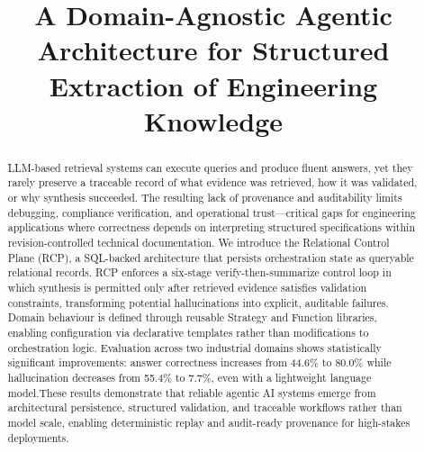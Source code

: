 \documentclass[largeformat]{interact}
\begin{document}
\title{A Domain-Agnostic Agentic Architecture for Structured Extraction of Engineering Knowledge}
\author{
}

\maketitle

\begin{abstract}
LLM-based retrieval systems can execute queries and produce fluent answers, yet they rarely preserve a traceable record of what evidence was retrieved, how it was validated, or why synthesis succeeded.
The resulting lack of provenance and auditability limits debugging, compliance verification, and operational trust—critical gaps for engineering applications where correctness depends on interpreting structured specifications within revision-controlled technical documentation. 
We introduce the Relational Control Plane (RCP), a SQL-backed architecture that persists orchestration state as queryable relational records. RCP enforces a six-stage verify-then-summarize control loop in which synthesis is permitted only after retrieved evidence satisfies validation constraints, transforming potential hallucinations into explicit, auditable failures. Domain behaviour is defined through reusable Strategy and Function libraries, enabling configuration via declarative templates rather than modifications to orchestration logic.
Evaluation across two industrial domains shows statistically significant improvements: answer correctness increases from 44.6\% to 80.0\% while hallucination decreases from 55.4\% to 7.7\%, even with a lightweight language model.These results demonstrate that reliable agentic AI systems emerge from architectural persistence, structured validation, and traceable workflows rather than model scale, enabling deterministic replay and audit-ready provenance for high-stakes deployments.
\end{abstract}
\end{document}
